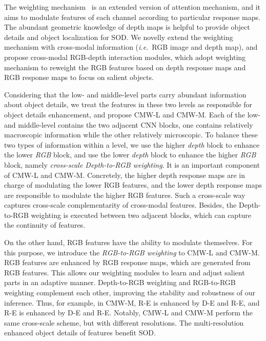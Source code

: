 \documentclass[runningheads]{llncs}
\newcommand{\ie}{\emph{i.e.}}
\begin{document}
The weighting mechanism~\cite{2018Weighting} is an extended version
of attention mechanism, and it aims to modulate features of each channel
according to particular response maps.
The abundant geometric knowledge of depth maps is helpful to provide
object details and object localization for SOD.
We novelly extend the weighting mechanism with cross-modal information
(\ie~RGB image and depth map), and propose cross-modal RGB-depth interaction modules,
which adopt weighting mechanism to reweight the RGB features
based on depth response maps and RGB response maps to focus
on salient objects.


Considering that the low- and middle-level parts carry abundant information about object details, we treat the features in these two levels as responsible for object details enhancement, and propose CMW-L and CMW-M.
Each of the low- and middle-level contains the two adjacent CNN blocks, one contains relatively macroscopic information while the other relatively microscopic.
To balance these two types of information within a level, we use the higher \textit{depth} block to enhance the lower \textit{RGB} block, and use the lower \textit{depth} block to enhance the higher \textit{RGB} block, namely \textit{cross-scale Depth-to-RGB weighting}.
It is an important component of CMW-L and CMW-M.
Concretely, the higher depth response maps are in charge of modulating the lower RGB features,
and the lower depth response maps are responsible to modulate the higher RGB features.
Such a cross-scale way captures cross-scale complementarity of cross-modal features.
Besides, the Depth-to-RGB weighting is executed between two adjacent blocks, which can
capture the continuity of features.


On the other hand, RGB features have the ability to modulate themselves.
For this purpose, we introduce the \textit{RGB-to-RGB weighting} to CMW-L and CMW-M.
RGB features are enhanced by RGB response maps, which are generated from RGB features.
This allows our weighting modules to learn and adjust salient parts in an adaptive manner.
Depth-to-RGB weighting and RGB-to-RGB weighting complement each other, improving the stability and robustness of our inference.
Thus, for example, in CMW-M,
R-E is enhanced by D-E and R-E, and
R-E is enhanced by D-E and R-E.
Notably, CMW-L and CMW-M perform the same cross-scale scheme, but with different resolutions.
The multi-resolution enhanced object details of features benefit SOD.
\end{document}
